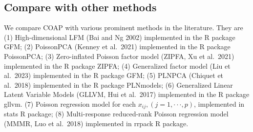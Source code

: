 \documentclass[
]{article}
\newenvironment{Shaded}{\begin{snugshade}}{\end{snugshade}}
\newcommand{\ControlFlowTok}[1]{\textcolor[rgb]{0.13,0.29,0.53}{\textbf{#1}}}
\newcommand{\DecValTok}[1]{\textcolor[rgb]{0.00,0.00,0.81}{#1}}
\newcommand{\KeywordTok}[1]{\textcolor[rgb]{0.13,0.29,0.53}{\textbf{#1}}}
\newcommand{\NormalTok}[1]{#1}
\newcommand{\OperatorTok}[1]{\textcolor[rgb]{0.81,0.36,0.00}{\textbf{#1}}}
\newcommand{\StringTok}[1]{\textcolor[rgb]{0.31,0.60,0.02}{#1}}
\begin{document}
\begin{Shaded}
\end{Shaded}

\hypertarget{compare-with-other-methods}{%
\subsection{Compare with other
methods}\label{compare-with-other-methods}}

We compare COAP with various prominent methods in the literature. They
are (1) High-dimensional LFM (Bai and Ng 2002) implemented in the R
package GFM; (2) PoissonPCA (Kenney et al.~2021) implemented in the R
package PoissonPCA; (3) Zero-inflated Poisson factor model (ZIPFA, Xu et
al.~2021) implemented in the R package ZIPFA; (4) Generalized factor
model (Liu et al.~2023) implemented in the R package GFM; (5) PLNPCA
(Chiquet et al.~2018) implemented in the R package PLNmodels; (6)
Generalized Linear Latent Variable Models (GLLVM, Hui et al.~2017)
implemented in the R package gllvm. (7) Poisson regression model for
each \(x_{ij}, (j = 1,··· ,p)\), implemented in stats R package; (8)
Multi-response reduced-rank Poisson regression model (MMMR, Luo et
al.~2018) implemented in rrpack R package.
\end{document}
